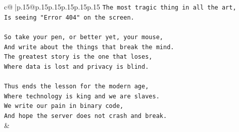 \documentclass{article}
\begin{document}
{\begin{supertabular}{c@{$\;$}|p{.15\linewidth}@{}p{.15\linewidth}p{.15\linewidth}p{.15\linewidth}p{.15\linewidth}p{.15\linewidth}}
{{{\texttt{The most tragic thing in all the art,} \\
\texttt{Is seeing "Error 404" on the screen.} \\
\\ 
\texttt{So take your pen, or better yet, your mouse,} \\
\texttt{And write about the things that break the mind.} \\
\texttt{The greatest story is the one that loses,} \\
\texttt{Where data is lost and privacy is blind.} \\
\\ 
\texttt{Thus ends the lesson for the modern age,} \\
\texttt{Where technology is king and we are slaves.} \\
\texttt{We write our pain in binary code,} \\
\texttt{And hope the server does not crash and break.} \\
            }
        }
    }
    & \\ \\


\end{supertabular}}
\end{document}
